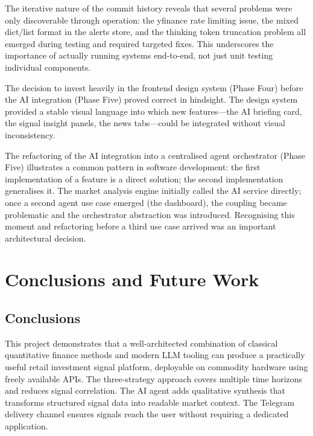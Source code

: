 \documentclass[12pt,a4paper]{article}
\begin{document}
The iterative nature of the commit history reveals that several problems were only discoverable through operation: the yfinance rate limiting issue, the mixed dict/list format in the alerts store, and the thinking token truncation problem all emerged during testing and required targeted fixes. This underscores the importance of actually running systems end-to-end, not just unit testing individual components.

The decision to invest heavily in the frontend design system (Phase Four) before the AI integration (Phase Five) proved correct in hindsight. The design system provided a stable visual language into which new features---the AI briefing card, the signal insight panels, the news tabs---could be integrated without visual inconsistency.

The refactoring of the AI integration into a centralised agent orchestrator (Phase Five) illustrates a common pattern in software development: the first implementation of a feature is a direct solution; the second implementation generalises it. The market analysis engine initially called the AI service directly; once a second agent use case emerged (the dashboard), the coupling became problematic and the orchestrator abstraction was introduced. Recognising this moment and refactoring before a third use case arrived was an important architectural decision.

\section{Conclusions and Future Work}

\subsection{Conclusions}

This project demonstrates that a well-architected combination of classical quantitative finance methods and modern LLM tooling can produce a practically useful retail investment signal platform, deployable on commodity hardware using freely available APIs. The three-strategy approach covers multiple time horizons and reduces signal correlation. The AI agent adds qualitative synthesis that transforms structured signal data into readable market context. The Telegram delivery channel ensures signals reach the user without requiring a dedicated application.
\end{document}
